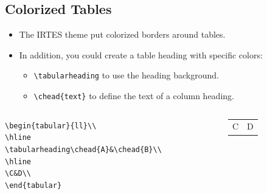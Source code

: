 \documentclass[english,circlenumberstyle]{irtesbeamer}
\begin{document}
\subsection{Colorized Tables}
\begin{frame}{\subsecname}
	\begin{itemize}
	\item The IRTES theme put colorized borders around tables.
	\item In addition, you could create a table heading with specific colors:
		\begin{itemize}
		\item \texttt{{\textbackslash}tabularheading} to use the heading background.
		\item \texttt{{\textbackslash}chead\{text\}} to define the text of a column heading.
		\end{itemize}
	\end{itemize}
	\begin{example}
		\begin{columns}
			\begin{column}{.6\linewidth}
				\footnotesize
				\texttt{{\textbackslash}begin\{tabular\}\{{\textbar}l{\textbar}l{\textbar}\}{\textbackslash}{\textbackslash}} \\
				\texttt{{\textbackslash}hline} \\
				\texttt{{\textbackslash}tabularheading{\textbackslash}chead\{A\}\&{\textbackslash}chead\{B\}{\textbackslash}{\textbackslash}} \\
				\texttt{{\textbackslash}hline} \\
				\texttt{{\textbackslash}C\&D{\textbackslash}{\textbackslash}} \\
				\texttt{{\textbackslash}end\{tabular\}}
			\end{column}
			\begin{column}{.3\linewidth}
				\begin{tabular}{|l|l|}
					\hline
					\tabularheading\chead{A}&\chead{B} \\
					\hline
					C & D \\
					\hline
				\end{tabular}	
			\end{column}
		\end{columns}
	\end{example}
\end{frame}
\end{document}

